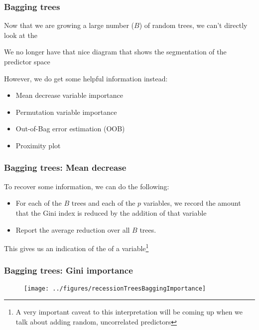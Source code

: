 \documentclass[12pt]{beamer}
\begin{document}
\begin{frame}[fragile]
\frametitle{Bagging trees}
Now that we are growing a large number ($B$) of random trees, we can't directly look at 
the 

\vsp
We no longer have that nice diagram that shows the segmentation of the predictor space 

\vsp
However, we do get some helpful information instead:

\vsp

\begin{itemize}
\item Mean decrease variable importance
\item Permutation variable importance
\item Out-of-Bag error estimation (OOB)

\item Proximity plot
\end{itemize}
\end{frame}


\begin{frame}[fragile]
\frametitle{Bagging trees: Mean decrease}
To recover some information, we can do the following:
\begin{itemize}
\item[1.] For each of the $B$ trees and each of the $p$ variables, we record the amount that the Gini index is reduced
by the addition of that variable 
\item[2.] Report the average reduction over all $B$ trees.
\end{itemize}

This gives us an indication of the  of a variable\footnote{A very important caveat to this interpretation
will be coming up when we talk about adding random, uncorrelated predictors}
\end{frame}
\begin{frame}[fragile]
\frametitle{Bagging trees: Gini importance}

\begin{figure}
\centering
\texttt{[image: ../figures/recessionTreesBaggingImportance]}
\end{figure}
\end{frame}
\end{document}
